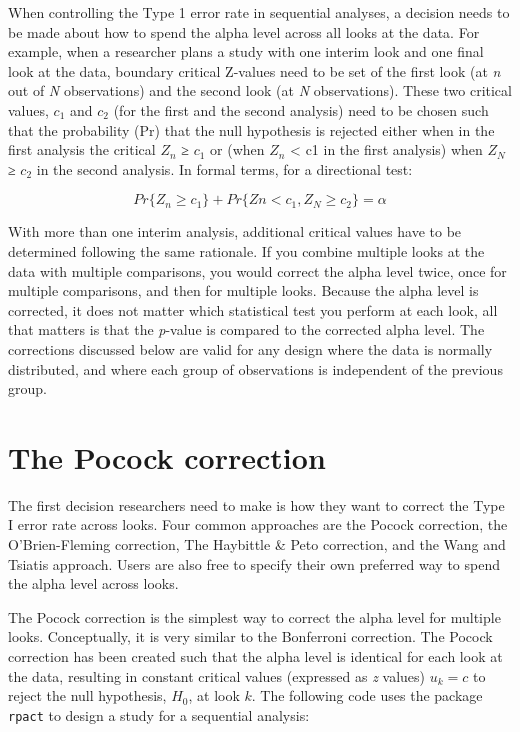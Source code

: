 \documentclass[
  oneside]{book}
\begin{document}
When controlling the Type 1 error rate in sequential analyses, a decision needs to be made about how to spend the alpha level across all looks at the data. For example, when a researcher plans a study with one interim look and one final look at the data, boundary critical Z-values need to be set of the first look (at \emph{n} out of \emph{N} observations) and the second look (at \emph{N} observations). These two critical values, \(c_1\) and \(c_2\) (for the first and the second analysis) need to be chosen such that the probability (Pr) that the null hypothesis is rejected either when in the first analysis the critical \(Z_n\) ≥ \(c_1\) or (when \(Z_n\) \textless{} c1 in the first analysis) when \(Z_N\) ≥ \(c_2\) in the second analysis. In formal terms, for a directional test:

\[Pr\{Z_n \geq c_1\} + Pr\{Zn < c_1, Z_N \geq c_2\} = \alpha\]

With more than one interim analysis, additional critical values have to be determined following the same rationale. If you combine multiple looks at the data with multiple comparisons, you would correct the alpha level twice, once for multiple comparisons, and then for multiple looks. Because the alpha level is corrected, it does not matter which statistical test you perform at each look, all that matters is that the \emph{p}-value is compared to the corrected alpha level. The corrections discussed below are valid for any design where the data is normally distributed, and where each group of observations is independent of the previous group.

\hypertarget{the-pocock-correction}{%
\section{The Pocock correction}\label{the-pocock-correction}}

The first decision researchers need to make is how they want to correct the Type I error rate across looks. Four common approaches are the Pocock correction, the O'Brien-Fleming correction, The Haybittle \& Peto correction, and the Wang and Tsiatis approach. Users are also free to specify their own preferred way to spend the alpha level across looks.

The Pocock correction is the simplest way to correct the alpha level for multiple looks. Conceptually, it is very similar to the Bonferroni correction. The Pocock correction has been created such that the alpha level is identical for each look at the data, resulting in constant critical values (expressed as \emph{z} values) \(u_k = c\) to reject the null hypothesis, \(H_0\), at look \(k\). The following code uses the package \texttt{rpact} to design a study for a sequential analysis:
\end{document}
